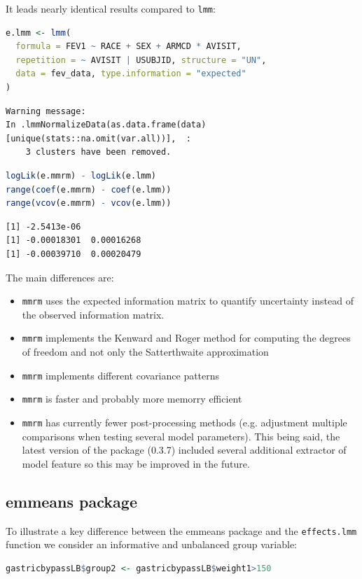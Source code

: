 \documentclass[12pt]{article}
\begin{document}
It leads nearly identical results compared to \texttt{lmm}:
\begin{lstlisting}[language=r,numbers=none]
e.lmm <- lmm(
  formula = FEV1 ~ RACE + SEX + ARMCD * AVISIT,
  repetition = ~ AVISIT | USUBJID, structure = "UN",
  data = fev_data, type.information = "expected"
)
\end{lstlisting}
\label{}
\begin{verbatim}
Warning message:
In .lmmNormalizeData(as.data.frame(data)[unique(stats::na.omit(var.all))],  :
    3 clusters have been removed.
\end{verbatim}


\begin{lstlisting}[language=r,numbers=none]
logLik(e.mmrm) - logLik(e.lmm)
range(coef(e.mmrm) - coef(e.lmm))
range(vcov(e.mmrm) - vcov(e.lmm))
\end{lstlisting}

\label{}
\begin{verbatim}
[1] -2.5413e-06
[1] -0.00018301  0.00016268
[1] -0.00039710  0.00020479
\end{verbatim}


The main differences are:
\begin{itemize}
\item \texttt{mmrm} uses the expected information matrix to quantify uncertainty
instead of the observed information matrix.
\item \texttt{mmrm} implements the Kenward and Roger method for computing the degrees of
freedom and not only the Satterthwaite approximation
\item \texttt{mmrm} implements different covariance patterns
\item \texttt{mmrm} is faster and probably more memorry efficient
\item \texttt{mmrm} has currently fewer post-processing methods (e.g. adjustment
multiple comparisons when testing several model parameters). This
being said, the latest version of the package (0.3.7) included
several additional extractor of model feature so this may be
improved in the future.
\end{itemize}
\subsection{emmeans package}
\label{sec:org8e8c233}

To illustrate a key difference between the emmeans package and the
\texttt{effects.lmm} function we consider an informative and unbalanced group
variable:
\begin{lstlisting}[language=r,numbers=none]
gastricbypassLB$group2 <- gastricbypassLB$weight1>150
\end{lstlisting}
\end{document}
